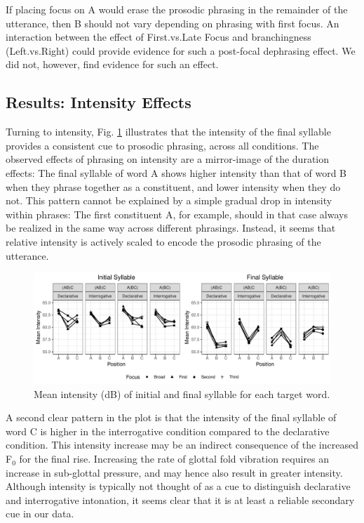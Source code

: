 \documentclass[preprint,review,12pt,authoryear,times]{elsarticle}
\begin{document}
If placing focus on A would erase the prosodic phrasing in the remainder of the utterance, then B should not vary depending on phrasing with first focus. An interaction between the effect of First.vs.Late Focus and branchingness (Left.vs.Right) could provide evidence for such a post-focal dephrasing effect. We did not, however, find evidence for such an effect. 


\subsection{Results: Intensity Effects}

Turning to intensity, Fig. \ref{figureIntensity} illustrates that the intensity of the final syllable provides a consistent cue to prosodic phrasing, across all conditions.  The observed effects of phrasing on intensity are a mirror-image of the duration effects: The final syllable of word A shows higher intensity than that of word B when they phrase together as a constituent, and lower intensity when they do not. This pattern cannot be explained by a simple gradual drop in intensity within phrases: The first constituent A, for example, should in that case always be realized in the same way across different phrasings. Instead, it seems that relative intensity is actively scaled to encode the prosodic phrasing of the utterance. 

\begin{figure}[ht!]
	\begin{center}
		\includegraphics[width=5.4in]{Figures/Mean_Intensity.pdf}
		\caption{Mean intensity (dB) of initial and final syllable for each target word.}
		\label{figureIntensity}
	\end{center}
\end{figure}

A second clear pattern in the plot is that the intensity of the final syllable of word C is higher in the interrogative condition compared to the declarative condition. This intensity increase may be an indirect consequence of the increased F$_0$ for the final rise. Increasing the rate of glottal fold vibration requires an increase in sub-glottal pressure, and may hence also result in greater intensity. Although intensity is typically not thought of as a cue to distinguish declarative and interrogative intonation, it seems clear that it is at least a reliable secondary cue in our data. 
\end{document}
